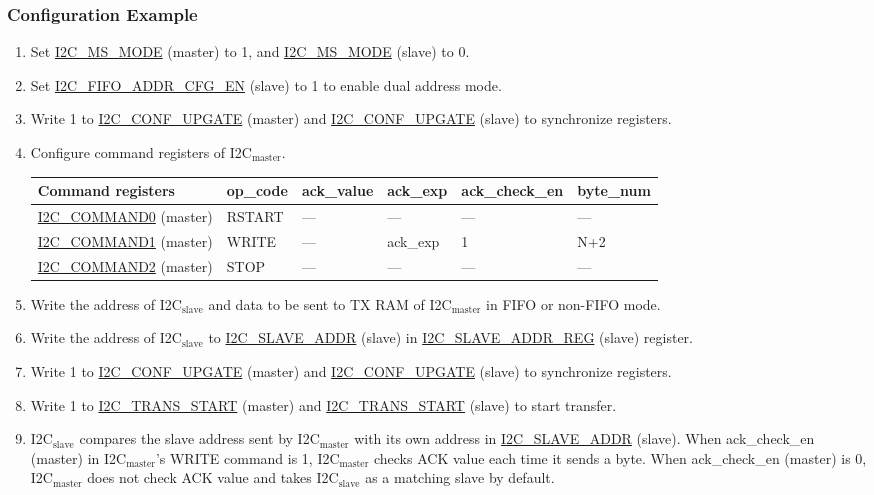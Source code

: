 \documentclass[main\_\_EN.tex]{subfiles}
\begin{document}
\subsubsection{Configuration Example}
\begin{enumerate}
\item Set \hyperref[fielddesc:I2CMSMODE]{I2C\_MS\_MODE} (master) to 1, and \hyperref[fielddesc:I2CMSMODE]{I2C\_MS\_MODE} (slave) to 0.
\item Set \hyperref[fielddesc:I2CFIFOADDRCFGEN]{I2C\_FIFO\_ADDR\_CFG\_EN} (slave) to 1 to enable dual address mode.
\item Write 1 to \hyperref[fielddesc:I2CCONFUPGATE]{I2C\_CONF\_UPGATE} (master) and \hyperref[fielddesc:I2CCONFUPGATE]{I2C\_CONF\_UPGATE} (slave) to synchronize registers.
\item Configure command registers of I2C$_\text{master}$.
\begin{longtable}{ | p{4cm} | p{2cm} | p{2cm} | p{2cm} |p{2cm} | p{2cm} |}
\hline\rowcolor{lightgray}
Command registers& op\_code & ack\_value&ack\_exp&ack\_check\_en&byte\_num  \\ \hline
\hyperref[fielddesc:I2CCOMMAND0]{I2C\_COMMAND0} (master)& RSTART& ---&---&---&---  \\ \hline
\hyperref[fielddesc:I2CCOMMAND1]{I2C\_COMMAND1} (master)& WRITE& ---&ack\_exp&1&N+2  \\ \hline
\hyperref[fielddesc:I2CCOMMAND2]{I2C\_COMMAND2} (master)& STOP& ---&---&---&---  \\ \hline
\end{longtable}
\item Write the address of I2C$_\text{slave}$ and data to be sent to TX RAM of I2C$_\text{master}$ in FIFO or non-FIFO mode.
\item Write the address of I2C$_\text{slave}$ to \hyperref[fielddesc:I2CSLAVEADDR]{I2C\_SLAVE\_ADDR} (slave) in \hyperref[regdesc:I2CSLAVEADDRREG]{I2C\_SLAVE\_ADDR\_REG} (slave) register.
\item Write 1 to \hyperref[fielddesc:I2CCONFUPGATE]{I2C\_CONF\_UPGATE} (master) and \hyperref[fielddesc:I2CCONFUPGATE]{I2C\_CONF\_UPGATE} (slave) to synchronize registers.
\item Write 1 to \hyperref[fielddesc:I2CTRANSSTART]{I2C\_TRANS\_START} (master) and \hyperref[fielddesc:I2CTRANSSTART]{I2C\_TRANS\_START} (slave) to start transfer.
\item I2C$_\text{slave}$ compares the slave address sent by I2C$_\text{master}$ with its own address in \hyperref[fielddesc:I2CSLAVEADDR]{I2C\_SLAVE\_ADDR} (slave). When ack\_check\_en (master) in I2C$_\text{master}$'s WRITE command is 1, I2C$_\text{master}$ checks ACK value each time it sends a byte. When ack\_check\_en (master) is 0, I2C$_\text{master}$ does not check ACK value and takes I2C$_\text{slave}$ as a matching slave by default.

\end{enumerate}
\end{document}
